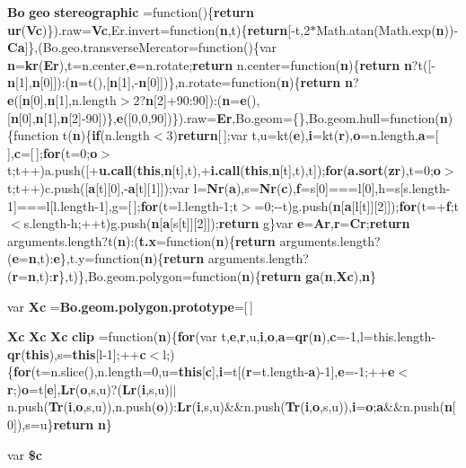 \begin{DoxyCompactItemize}
{\bf Bo} {\bf geo} {\bf stereographic} =function()\{{\bf return} {\bf ur}({\bf Vc})\}).raw={\bf Vc},Er.\+invert=function({\bf n},t)\{{\bf return}[-\/t,2$\ast$Math.\+atan(Math.\+exp({\bf n}))-\/{\bf Ca}]\},(Bo.\+geo.\+transverse\+Mercator=function()\{var {\bf n}={\bf kr}({\bf Er}),t=n.\+center,{\bf e}=n.\+rotate;{\bf return} n.\+center=function({\bf n})\{{\bf return} {\bf n}?t([-\/{\bf n}[1],{\bf n}[0]])\+:({\bf n}=t(),[{\bf n}[1],-\/{\bf n}[0]])\},n.\+rotate=function({\bf n})\{{\bf return} {\bf n}?{\bf e}([{\bf n}[0],{\bf n}[1],n.\+length$>$2?{\bf n}[2]+90\+:90])\+:({\bf n}={\bf e}(),[{\bf n}[0],{\bf n}[1],{\bf n}[2]-\/90])\},{\bf e}([0,0,90])\}).raw={\bf Er},Bo.\+geom=\{\},Bo.\+geom.\+hull=function({\bf n})\{function t({\bf n})\{{\bf if}(n.\+length$<$3){\bf return}[$\,$];var t,u=kt({\bf e}),{\bf i}=kt({\bf r}),{\bf o}=n.\+length,{\bf a}=[$\,$],{\bf c}=[$\,$];{\bf for}(t=0;{\bf o}$>$t;t++)a.\+push([+{\bf u.\+call}({\bf this},{\bf n}[t],t),+{\bf i.\+call}({\bf this},{\bf n}[t],t),t]);{\bf for}({\bf a.\+sort}({\bf zr}),t=0;{\bf o}$>$t;t++)c.\+push([{\bf a}[t][0],-\/{\bf a}[t][1]]);var l={\bf Nr}({\bf a}),s={\bf Nr}({\bf c}),{\bf f}=s[0]===l[0],h=s[s.\+length-\/1]===l[l.\+length-\/1],g=[$\,$];{\bf for}(t=l.\+length-\/1;t$>$=0;-\/-\/t)g.\+push({\bf n}[{\bf a}[l[t]][2]]);{\bf for}(t=+{\bf f};t$<$s.\+length-\/h;++t)g.\+push({\bf n}[{\bf a}[s[t]][2]]);{\bf return} g\}var {\bf e}={\bf Ar},{\bf r}={\bf Cr};{\bf return} arguments.\+length?t({\bf n})\+:({\bf t.\+x}=function({\bf n})\{{\bf return} arguments.\+length?({\bf e}={\bf n},t)\+:{\bf e}\},t.\+y=function({\bf n})\{{\bf return} arguments.\+length?({\bf r}={\bf n},t)\+:{\bf r}\},t)\},Bo.\+geom.\+polygon=function({\bf n})\{{\bf return} {\bf ga}({\bf n},{\bf Xc}),{\bf n}\}
\item 
var {\bf Xc} ={\bf Bo.\+geom.\+polygon.\+prototype}=[$\,$]
\item 
{\bf Xc} {\bf Xc} {\bf Xc} {\bf clip} =function({\bf n})\{{\bf for}(var t,{\bf e},{\bf r},u,{\bf i},{\bf o},{\bf a}={\bf qr}({\bf n}),{\bf c}=-\/1,l=this.\+length-\/{\bf qr}({\bf this}),s={\bf this}[l-\/1];++{\bf c}$<$l;)\{{\bf for}(t=n.\+slice(),n.\+length=0,u={\bf this}[{\bf c}],{\bf i}=t[({\bf r}=t.\+length-\/{\bf a})-\/1],{\bf e}=-\/1;++{\bf e}$<${\bf r};){\bf o}=t[{\bf e}],{\bf Lr}({\bf o},s,u)?({\bf Lr}({\bf i},s,u)$\vert$$\vert$n.\+push({\bf Tr}({\bf i},{\bf o},s,u)),n.\+push({\bf o}))\+:{\bf Lr}({\bf i},s,u)\&\&n.\+push({\bf Tr}({\bf i},{\bf o},s,u)),{\bf i}={\bf o};{\bf a}\&\&n.\+push({\bf n}[0]),s=u\}{\bf return} {\bf n}\}
\item 
var {\bf \$c}
$$
\end{DoxyCompactItemize}
